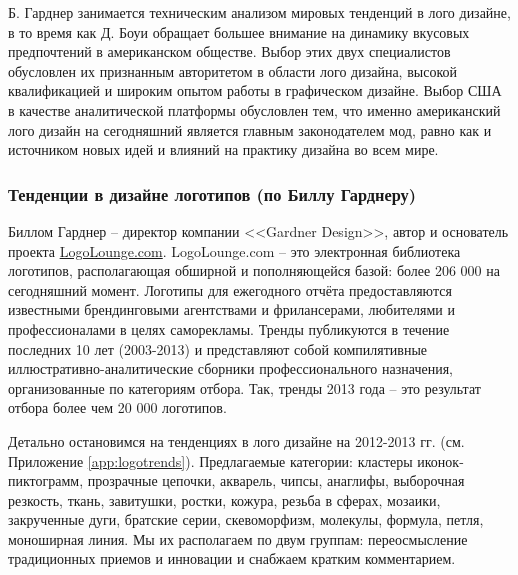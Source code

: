 Б. Гарднер занимается техническим анализом мировых тенденций в лого дизайне, в то время как  Д. Боуи
обращает большее внимание на динамику вкусовых предпочтений в американском обществе. Выбор этих двух
специалистов обусловлен их признанным авторитетом в области лого дизайна,  высокой квалификацией и
широким опытом работы в графическом дизайне.  Выбор США в качестве аналитической платформы
обусловлен  тем, что именно американский лого дизайн на сегодняшний является главным законодателем
мод, равно как и источником новых идей и влияний на практику дизайна во всем мире.

\subsubsection{Тенденции в дизайне логотипов (по Биллу Гарднеру)}

Биллом Гарднер -- директор компании <<Gardner Design>>, автор и основатель проекта
\url{LogoLounge.com}. LogoLounge.com -- это электронная библиотека логотипов, располагающая обширной и
пополняющейся базой: более 206 000 на сегодняшний момент. Логотипы для ежегодного отчёта
предоставляются известными брендинговыми агентствами и фрилансерами, любителями и профессионалами в
целях саморекламы. Тренды публикуются в течение последних 10 лет (2003-2013) и представляют собой
компилятивные иллюстративно-аналитические сборники профессионального назначения, организованные по
категориям отбора. Так, тренды 2013 года -- это результат отбора более чем 20 000 логотипов.
\autocite{link:logolounge2012}\autocite{link:logolounge2013}

Детально остановимся на тенденциях в лого дизайне на 2012-2013 гг.
(см. Приложение \ref{app:logotrends}). Предлагаемые категории: кластеры иконок-пиктограмм,
прозрачные цепочки, акварель, чипсы, анаглифы, выборочная резкость, ткань, завитушки, ростки,
кожура, резьба в сферах, мозаики, закрученные дуги, братские серии, скевоморфизм, молекулы, формула,
петля, моноширная линия.  Мы их располагаем по двум группам: переосмысление традиционных приемов
и инновации и снабжаем кратким комментарием.

